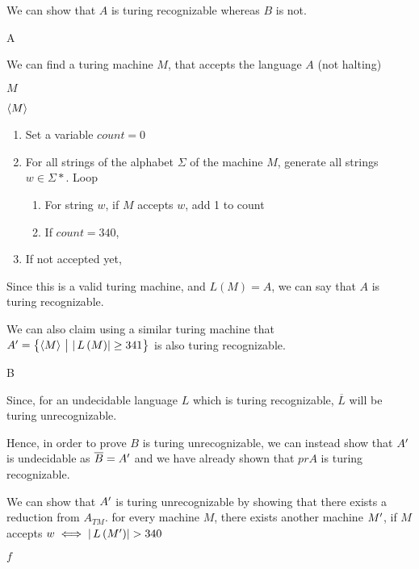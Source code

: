 \documentclass{article}
\begin{document}
\begin{question}

	We can show that $A$ is turing recognizable whereas $B$ is not.

	\begin{qpart}{A}

		We can find a turing machine $M$, that accepts the language $A$ (not halting) \br%

		 $M$ \br%

		 $\left\langle M \right\rangle$
		\begin{enumerate}[label= (\alph*) ]
			\item Set a variable $count = 0$
			\item For all strings of the alphabet $\Sigma$ of the machine $M$, generate all strings $w \in \Sigma*$. Loop
			\begin{enumerate}[label= (\roman*) ]
				\item For string $w$, if $M$ accepts $w$, add 1 to count
				\item If $count = 340$, 
			\end{enumerate}
			\item If not accepted yet, 
		\end{enumerate}

		Since this is a valid turing machine, and $L(M) = A$, we can say that $A$ is turing recognizable.

		We can also claim using a similar turing machine that $\pr{A} = \set{\angl{M} \pipe \abs{\func{L}{M}} \ge 341}$ is also turing recognizable.

	\end{qpart}

	\begin{qpart}{B}

		Since, for an undecidable language $L$ which is turing recognizable, $\overline{L}$ will be turing unrecognizable. \br%

		Hence, in order to prove $B$ is turing unrecognizable, we can instead show that $A^{\prime}$ is undecidable as $\overline{B} = A^{\prime}$ and we have already shown that $pr{A}$ is turing recognizable. \br%

		We can show that $A^{\prime}$ is turing unrecognizable by showing that there exists a reduction from $A_{TM}$.  for every machine $M$, there exists another machine $M^{\prime}$, if $M$ accepts $w \iff \abs{\func{L}{\pr{M}}} > 340$  \br%

		 $f$ \br%


\end{qpart}
\end{question}
\end{document}
